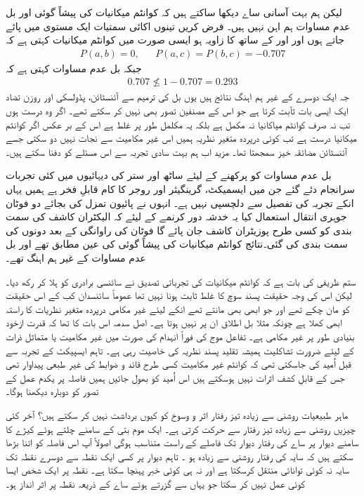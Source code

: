 لیکن ہم بہت آسانی ساے دیکھا ساکتے ہیں کہ کوانٹم میکانیات کی پیشاً گوئی  اور بل عدم مساوات ہم اہن نہیں ہیں۔ فرض کریں تینوں اکائی سمتیات ایک مستوی میں پائے جاتے ہوں اور  اور  کے ساتھ  کا زاویہ  ہو  ایسی صورت میں کوانٹم میکانیات کہتی ہے کہ 
\begin{align*}
	P(a, b) = 0, && P(a, c) = P(b, c) = -\num{0.707}
\end{align*}
جبکہ بل عدم مساوات کہتی ہے کہ
\begin{align*}
	\num{0.707}\nleq1-\num{0.707} = \num{0.293}
\end{align*}
جہ ایک دوسرے کے غیر ہم اہنگ نتائج ہیں یوں بل کی ترمیم سے آئنسٹائن، پڈولسکی اور روزن تضاد ایک ایسی بات ثآبت کرتا ہے جو اس کے مصنفین تصور بھی نہیں کر سکتے تھے۔ اگر وہ درست ہوں تب نہ صرف کوانٹم میاکانیا نہ مکمل ہے بلکہ یہ مکلمل طور پر غلط ہے اس کے بر عکس اگر کوانٹم میکانیا درست ہے تب کوئی درپردہ متغیر نظریہ ہمیں اس غیر مکامیت سے نجات نہیں دو سکتی جسے آئنسٹائن مضائقہ خیز سمجھتا تھا۔	 مزید اب ہم بہت سادی تجربہ سے اس مسئلے کو دفنا سکتے ہیں۔

بل عدم مساوات کو پرکھنے کے لیئے ساٹھ اور ستر کی دیہائیوں میں کئی تجربات سرانجام دئے گئے جن میں ایسمیکٹ، گرینگیئر اور روجر کا کام قابلِ فخر ہے ہمیں یہاں انکے تجربہ کی تفصیل سے دلچسپی نہیں ہے۔ انہوں نے پائیون تمزل کی بجائے دو فوٹان جوہری انتقال استعمال کیا یہ خدشہ دور کرنمے کے لیئے کہ الیکٹران کاشف کی سمت بندی کو کسی طرح پوزیٹران کاشف جان پائے گا  فوٹان کی راوانگی کے بعد دونوں کی سمت بندی کی گئی۔نتائج کوانٹم میکانیات کی پیشاً گوئی کی عین مطابق تھے اور بل عدم مساوات کے غیر ہم اہنگ تھے۔

ستم ظریفی کی بات ہے کہ کوانٹم میکانیات کی تجرباتی تصدیق نے سائنسی برادری کو ہلا کر رکھ دیا۔ لیکن اس کی وجہ حقیقت پسند سوچ کا غلط ثابت ہونا نہیں تھا عموماً سائنسدان کب کے اس حقیقت کو مان چکے تھے اور جو ابھی بھی مانتے تھے انکے لیئے غیر مکامی درپردہ متغیر نظریات کا راستہ ابھی کھلا ہے چونکہ مثلا بل اطلاق ان پر نہیں ہوتا ہے۔ اصل سدمہ اس بات کا تھا کہ قدرت ازخود بنیادی طور پر غیر مکامی ہے۔ تفاعل موج کی فوراً انہدام کی صورت میں غیر مکامیت یا متماثل ذرات کے لیئے ضرورت تشاکلیت ہمیشہ تقلید پسند نظریہ کی خاصیت رہی ہے۔ تاہم ایسپیکٹ کے تجربہ سے قبل اُمید کی جاسکتی تھی کہ کوانٹم غیر مکامیت کسی طرح قائد و ضوابط کی غیر طبعی پیداوار تھی جس کے قابلِ کشف اثرات نہیں ہوسکتے ہیں اس اُمید کو بھول جائیں ہمیں فاصلہ پر یکدم عمل کے تصور کو دوبارہ دیکھنا ہوگا۔

ماہر طبیعیات روشنی سے زیادہ تیز رفتار اثر و وسوخ کو کیوں برداشت نہیں کر سکتے ہیں؟ آخر کئی چیزیں روشنی سے زیادہ تیز رفتار سے حرکت کرتی ہے۔ ایک موم بتی کے سامنے چلتے ہوئے کیڑے کا سامنے دیوار پر ساے کی رفتار دیوار تک فاصلے کے راست متناسب ہوگی اصولاً آپ اس فاصلہ کو اتنا بڑھا سکتے ہیں کہ سایہ کی رفتار روشنی سے زیادہ ہو ۔ تاہم دیوار پر کسی ایک نقطہ سے دوسرے نقطہ تک سایہ نہ کوئی توانائی منتقل کرسکتا ہے اور نہ ہی کوئی خبر پہنچا سکتا ہے۔ نقطہ  پر ایک شخص ایسا کوئی عمل نہیں کر سکتا جو یہاں سے گزرتے ہوئے ساے کے ذریعہ نقطہ  پر اثر انداز ہو۔

